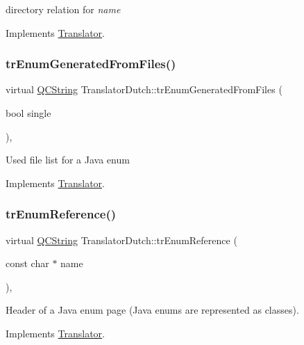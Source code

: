 directory relation for {\itshape name} 

Implements \mbox{\hyperlink{class_translator}{Translator}}.

\mbox{\label{class_translator_dutch_a31d3ea98c32a9fbdd2bcfe21f89b9cc3}} 
\subsubsection{\texorpdfstring{trEnumGeneratedFromFiles()}{trEnumGeneratedFromFiles()}}
{\footnotesize\ttfamily virtual \mbox{\hyperlink{class_q_c_string}{Q\+C\+String}} Translator\+Dutch\+::tr\+Enum\+Generated\+From\+Files (\begin{DoxyParamCaption}\item[{bool}]{single }\end{DoxyParamCaption})\hspace{0.3cm}{\ttfamily [inline]}, {\ttfamily [virtual]}}

Used file list for a Java enum 

Implements \mbox{\hyperlink{class_translator}{Translator}}.

\mbox{\label{class_translator_dutch_aa2a32e10d3ced164adcd563bac05b1b6}} 
\subsubsection{\texorpdfstring{trEnumReference()}{trEnumReference()}}
{\footnotesize\ttfamily virtual \mbox{\hyperlink{class_q_c_string}{Q\+C\+String}} Translator\+Dutch\+::tr\+Enum\+Reference (\begin{DoxyParamCaption}\item[{const char $\ast$}]{name }\end{DoxyParamCaption})\hspace{0.3cm}{\ttfamily [inline]}, {\ttfamily [virtual]}}

Header of a Java enum page (Java enums are represented as classes). 

Implements \mbox{\hyperlink{class_translator}{Translator}}.

